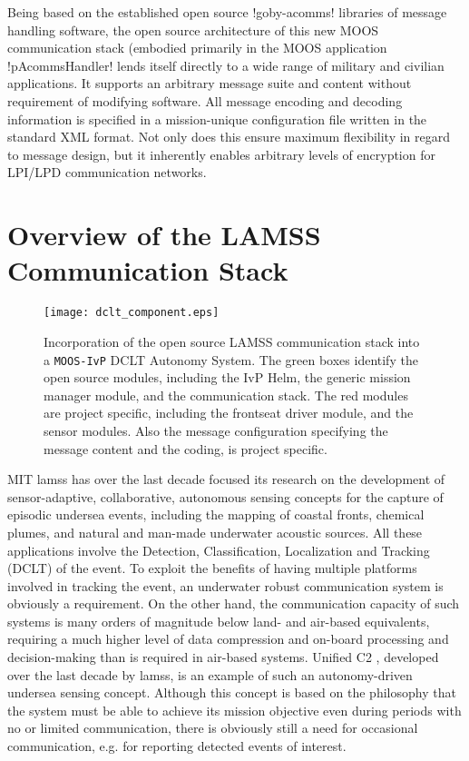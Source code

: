 Being based on the established open source !goby-acomms! libraries of message handling software, the
open source architecture of this new MOOS communication stack (embodied primarily in the MOOS application !pAcommsHandler! lends
itself directly to a wide range of military and civilian
applications. It supports an arbitrary message suite and
content without requirement of modifying software. All message encoding and
decoding information is specified in a mission-unique configuration
file written in the standard XML format. Not only does this ensure
maximum flexibility in regard to message design, but it inherently
enables arbitrary levels of encryption for LPI/LPD communication
networks.

\section{Overview of the LAMSS Communication Stack}

\begin{figure}[tp]
  \centering 
  \texttt{[image: dclt\_component.eps]}
\caption{Incorporation of the open source LAMSS communication stack into
 a \texttt{MOOS-IvP} DCLT Autonomy System. The green boxes identify the
 open source modules, including the IvP Helm, the generic mission
 manager module, and the communication stack. The red modules are
 project specific, including the frontseat driver module, and the
 sensor modules. Also the message configuration specifying the message
 content and the coding, is project specific. \label{lamss_dclt}} 
\end{figure}

MIT \gls{lamss} \cite{lamss} has over the last decade focused its research on the
development of sensor-adaptive, collaborative, autonomous sensing
concepts for the capture of episodic undersea events, including the
mapping of coastal fronts, chemical plumes, and natural and man-made
underwater acoustic sources. All these applications involve the
Detection, Classification, Localization and Tracking (DCLT) of the
event. To exploit the benefits of having multiple platforms involved
in tracking the event, an underwater robust communication system is
obviously a requirement. On the other hand, the communication capacity
of such systems is many orders of magnitude below land- and air-based
equivalents, requiring a much higher level of data compression and
on-board processing and decision-making than is required in air-based
systems. Unified C2 \cite{unified_c2}, developed over the
last decade by \gls{lamss}, is an example of such an autonomy-driven
undersea sensing concept. Although this concept is based on the
philosophy that the system must be able to achieve its mission
objective even during periods with no or limited communication, there
is obviously still a need for occasional communication, e.g. for
reporting detected events of interest.

